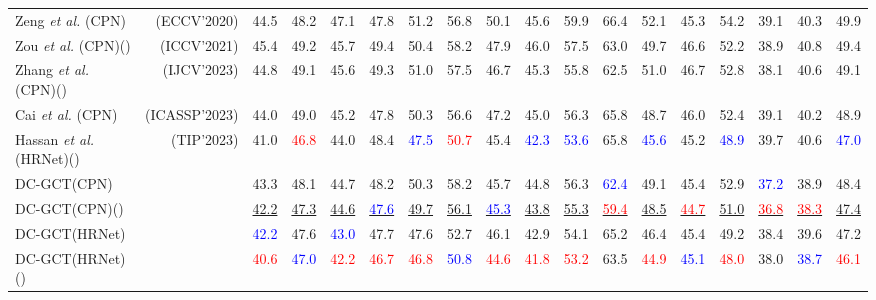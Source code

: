 \documentclass[journal]{IEEEtran}
\begin{document}
\begin{table*}[htbp]
{\begin{tabular}{lr|ccccccccccccccc|c}
Zeng \textit{et al.} \cite{zeng2020srnet}(CPN) &(ECCV'2020) &44.5 &48.2 &47.1 &47.8 &51.2 &56.8 &50.1 &45.6 &59.9 &66.4 &52.1 &45.3 &54.2 &39.1 &40.3 &49.9 \\ 
Zou \textit{et al.} \cite{zou2021modulated}(CPN)() &(ICCV'2021) &45.4 &49.2 &45.7 &49.4 &50.4 &58.2 &47.9 &46.0 &57.5 &63.0 &49.7 &46.6 &52.2 &38.9 &40.8 &49.4 \\

Zhang \textit{et al.} \cite{zhang2023learning}(CPN)() &(IJCV'2023) &44.8 &49.1 &45.6 &49.3 &51.0 &57.5 &46.7 &45.3 &55.8 &62.5 &51.0 &46.7 &52.8 &38.1 &40.6 &49.1 \\



Cai \textit{et al.} \cite{cai2023htnet}(CPN) &(ICASSP'2023) &44.0 &49.0 &45.2 &47.8 &50.3 &56.6 &47.2 &45.0 &56.3 &65.8 &48.7 &46.0 &52.4 &39.1 &40.2 &48.9 \\

Hassan \textit{et al.} \cite{hassan2023regular}(HRNet)() &(TIP'2023) &41.0 &\textcolor{red}{46.8} &44.0 &48.4 &\textcolor{blue}{47.5} &\textcolor{red}{50.7} &45.4 &\textcolor{blue}{42.3} &\textcolor{blue}{53.6} &65.8 &\textcolor{blue}{45.6} &45.2 &\textcolor{blue}{48.9} &39.7 &40.6 &\textcolor{blue}{47.0}\\

\hline

DC-GCT(CPN) &                        &43.3 &48.1 &44.7 &48.2 &50.3 &58.2 &45.7 &44.8 &56.3 &\textcolor{blue}{62.4} &49.1 &45.4 &52.9 &\textcolor{blue}{37.2} &38.9 &48.4 \\
DC-GCT(CPN)()  &            &\underline{42.2} &\underline{47.3} &\underline{44.6} &\underline{\textcolor{blue}{47.6}} &\underline{49.7} &\underline{56.1} &\underline{\textcolor{blue}{45.3}} &\underline{43.8} &\underline{55.3} &\underline{\textcolor{red}{59.4}} &\underline{48.5} &\underline{\textcolor{red}{44.7}} &\underline{51.0} &\underline{\textcolor{red}{36.8}} &\underline{\textcolor{red}{38.3}} &\underline{47.4} \\

DC-GCT(HRNet) &                        &\textcolor{blue}{42.2} &47.6 &\textcolor{blue}{43.0} &47.7 &47.6 &52.7 &46.1 &42.9 &54.1 &65.2 &46.4 &45.4 &49.2 &38.4 &39.6 &47.2 \\
DC-GCT(HRNet)()  &            &\textcolor{red}{40.6} &\textcolor{blue}{47.0} &\textcolor{red}{42.2} &\textcolor{red}{46.7} &\textcolor{red}{46.8} &\textcolor{blue}{50.8} &\textcolor{red}{44.6} &\textcolor{red}{41.8} &\textcolor{red}{53.2} &63.5 &\textcolor{red}{44.9} &\textcolor{blue}{45.1} &\textcolor{red}{48.0} &38.0 &\textcolor{blue}{38.7} &\textcolor{red}{46.1} \\


\end{tabular}}
\end{table*}
\end{document}
